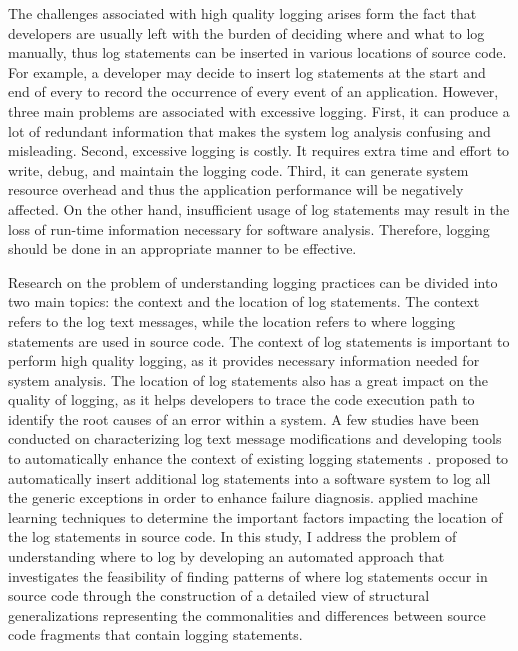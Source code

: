 The challenges associated with high quality logging arises form the fact that developers are usually left with the burden of deciding where and what to log manually, thus log statements can be inserted in various locations of source code. For example, a developer may decide to insert log statements at the start and end of every  to record the occurrence of every event of an application. However, three main problems are associated with excessive logging. First, it can produce a lot of redundant information that makes the system log analysis confusing and misleading. Second, excessive logging is costly. It requires extra time and effort to write, debug, and maintain the logging code. Third, it can generate system resource overhead and thus the application performance will be negatively affected. On the other hand, insufficient usage of log statements may result in the loss of run-time information necessary for software analysis. Therefore, logging should be done in an appropriate manner to be effective.


Research on the problem of understanding logging practices can be divided into two main topics: the context and the location of log statements. The context refers to the log text messages, while the location refers to where logging statements are used in source code. The context of log statements is important to perform high quality logging, as it provides necessary information needed for system analysis. The location of log statements also has a great impact on the quality of logging, as it helps developers to trace the code execution path to identify the root causes of an error within a system. A few studies have been conducted on characterizing log text message modifications \cite{yuan2012characterizing} and developing tools to automatically enhance the context of existing logging statements \cite{yuan2012improving, yuan2010sherlog}. \citet{yuan2012conservative} proposed  to automatically insert additional log statements into a software system to log all the generic exceptions in order to enhance failure diagnosis. \citet{zhu2015learning} applied machine learning techniques to determine the important factors impacting the location of the log statements in source code. In this study, I address the problem of understanding where to log by developing an automated approach that investigates the feasibility of finding patterns of where log statements occur in source code through the construction of a detailed view of structural generalizations representing the commonalities and differences between source code fragments that contain logging statements.

